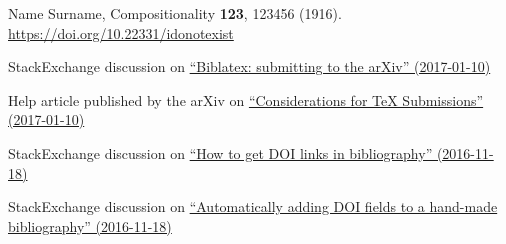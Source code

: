 \documentclass[a4paper,onecolumn,superscriptaddress,10pt,issue=1, volume=2, shorttitle=papers]{compositionalityarticle}
\begin{document}

\begin{thebibliography}{9}
  Name Surname,
  Compositionality \textbf{123}, 123456 (1916).
  \href{https://doi.org/10.22331/idonotexist}
       {https://doi.org/10.22331/idonotexist}

  StackExchange discussion on \href{http://tex.stackexchange.com/questions/26990/biblatex-submitting-to-the-arxiv}{``Biblatex: submitting to the arXiv'' (2017-01-10)}

  Help article published by the arXiv on \href{https://arxiv.org/help/submit_tex}{``Considerations for TeX Submissions'' (2017-01-10)}

  StackExchange discussion on \href{http://tex.stackexchange.com/questions/3802/how-to-get-doi-links-in-bibliography}{``How to get DOI links in bibliography'' (2016-11-18)}
  
  StackExchange discussion on \href{http://tex.stackexchange.com/questions/6810/automatically-adding-doi-fields-to-a-hand-made-bibliography}{``Automatically adding DOI fields to a hand-made bibliography'' (2016-11-18)}

\end{thebibliography}



\onecolumn\newpage
\end{document}
